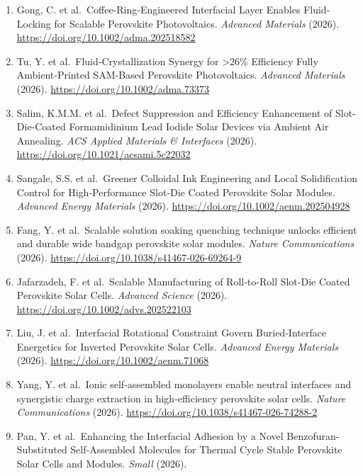 \documentclass[
  11pt,
]{article}
\begin{document}
\begin{enumerate}
  Wang, J. et al.~Redox‐Mediated Stabilization of the Hole Transport
  Layer and Buried Interface Toward Stable Perovskite Solar Cells.
  \emph{Angewandte Chemie International Edition} (2026).
  \url{https://doi.org/10.1002/anie.4012708}
\item
  Gong, C. et al.~Coffee‐Ring‐Engineered Interfacial Layer Enables
  Fluid‐Locking for Scalable Perovskite Photovoltaics. \emph{Advanced
  Materials} (2026). \url{https://doi.org/10.1002/adma.202518582}
\item
  Tu, Y. et al.~Fluid‐Crystallization Synergy for \textgreater26\%
  Efficiency Fully Ambient‐Printed SAM‐Based Perovskite Photovoltaics.
  \emph{Advanced Materials} (2026).
  \url{https://doi.org/10.1002/adma.73373}
\item
  Salim, K.M.M. et al.~Defect Suppression and Efficiency Enhancement of
  Slot-Die-Coated Formamidinium Lead Iodide Solar Devices via Ambient
  Air Annealing. \emph{ACS Applied Materials \& Interfaces} (2026).
  \url{https://doi.org/10.1021/acsami.5c22032}
\item
  Sangale, S.S. et al.~Greener Colloidal Ink Engineering and Local
  Solidification Control for High‐Performance Slot‐Die Coated Perovskite
  Solar Modules. \emph{Advanced Energy Materials} (2026).
  \url{https://doi.org/10.1002/aenm.202504928}
\item
  Fang, Y. et al.~Scalable solution soaking quenching technique unlocks
  efficient and durable wide bandgap perovskite solar modules.
  \emph{Nature Communications} (2026).
  \url{https://doi.org/10.1038/s41467-026-69264-9}
\item
  Jafarzadeh, F. et al.~Scalable Manufacturing of Roll‐to‐Roll Slot‐Die
  Coated Perovskite Solar Cells. \emph{Advanced Science} (2026).
  \url{https://doi.org/10.1002/advs.202522103}
\item
  Liu, J. et al.~Interfacial Rotational Constraint Govern
  Buried‐Interface Energetics for Inverted Perovskite Solar Cells.
  \emph{Advanced Energy Materials} (2026).
  \url{https://doi.org/10.1002/aenm.71068}
\item
  Yang, Y. et al.~Ionic self-assembled monolayers enable neutral
  interfaces and synergistic charge extraction in high-efficiency
  perovskite solar cells. \emph{Nature Communications} (2026).
  \url{https://doi.org/10.1038/s41467-026-74288-2}
\item
  Pan, Y. et al.~Enhancing the Interfacial Adhesion by a Novel
  Benzofuran‐Substituted Self‐Assembled Molecules for Thermal Cycle
  Stable Perovskite Solar Cells and Modules. \emph{Small} (2026).

\end{enumerate}
\end{document}
